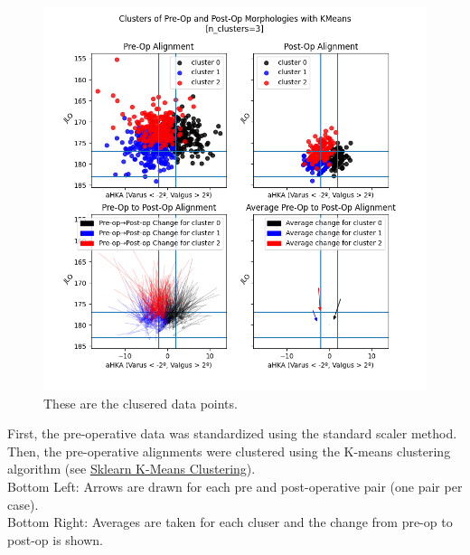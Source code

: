 \documentclass{article}
\begin{document}
\newpage

\begin{figure}[t]
\includegraphics[width=\textwidth]{clusters.png}
\caption{These are the clusered data points.}
\end{figure}

First, the pre-operative data was standardized using the standard scaler method.
Then, the pre-operative alignments were clustered using the K-means clustering algorithm
(see \href{https://scikit-learn.org/stable/modules/generated/sklearn.cluster.KMeans.html#sklearn.cluster.KMeans}
{\underline{Sklearn K-Means Clustering}}).\\
Bottom Left: Arrows are drawn for each pre and post-operative pair (one pair per case).\\
Bottom Right: Averages are taken for each cluser and the change from pre-op to post-op is shown.

\newpage
\end{document}
